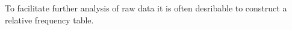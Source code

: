 
To facilitate further analysis of raw data it is often desribable to construct a relative frequency table.
